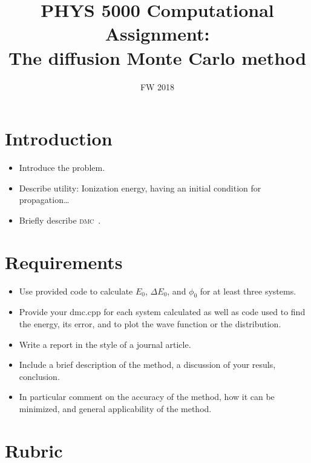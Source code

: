 \documentclass[letterpaper, 11 pt]{report}
\title{PHYS 5000 Computational Assignment:\\The diffusion Monte Carlo method}
\date{FW 2018}
\author{}
\begin{document}
\maketitle

\section*{Introduction}

\begin{itemize}

   \item Introduce the problem.

   \item Describe utility: Ionization energy, having an initial condition for propagation\dots

   \item Briefly describe \textsc{dmc}~\cite{dmc}.

\end{itemize}

\section*{Requirements}

\begin{itemize}

   \item Use provided code to calculate $E_0$, $\Delta E_0$, and $\phi_0$ for at least three systems.

   \item Provide your dmc.cpp for each system calculated as well as code used to find the energy, its
      error, and to plot the wave function or the distribution.

   \item Write a report in the style of a journal article.

   \item Include a brief description of the method, a discussion of your resuls, conclusion.

   \item In particular comment on the accuracy of the method, how it can be minimized, and general
      applicability of the method.

\end{itemize}

\section*{Rubric}

\printbibliography[title=References]
\end{document}
